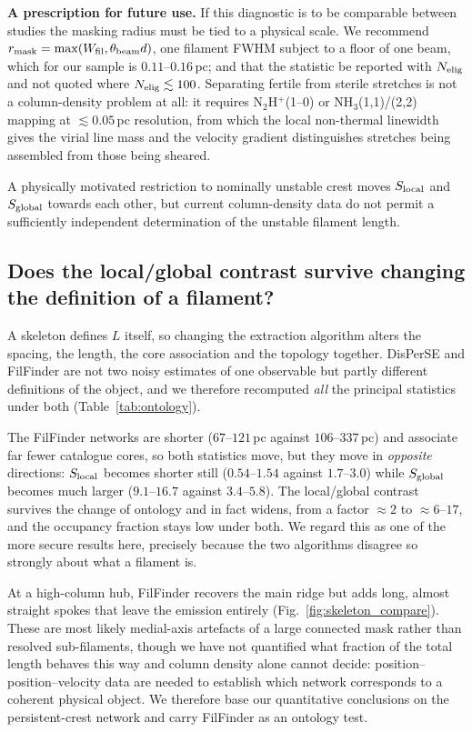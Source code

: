\documentclass[usenatbib,twoside,twocolumn]{mnras}
\begin{document}
\smallskip\noindent\textbf{A prescription for future use.} If this diagnostic is to be comparable between studies the masking radius must be tied to a physical scale. We recommend $r_{\rm mask}=\max(W_{\rm fil},\theta_{\rm beam}d)$, one filament FWHM subject to a floor of one beam, which for our sample is $0.11$--$0.16$\,pc; and that the statistic be reported with $N_{\rm elig}$ and not quoted where $N_{\rm elig}\lesssim100$. Separating fertile from sterile stretches is not a column-density problem at all: it requires N$_2$H$^+$(1--0) or NH$_3$(1,1)/(2,2) mapping at $\lesssim0.05$\,pc resolution, from which the local non-thermal linewidth gives the virial line mass and the velocity gradient distinguishes stretches being assembled from those being sheared.

A physically motivated restriction to nominally unstable crest moves $S_{\rm local}$ and $S_{\rm global}$ towards each other, but current column-density data do not permit a sufficiently independent determination of the unstable filament length.



\subsection{Does the local/global contrast survive changing the definition of a filament?}
\label{sec:ontology}

A skeleton defines $L$ itself, so changing the extraction algorithm alters the spacing, the length, the core association and the topology together. DisPerSE and FilFinder are not two noisy estimates of one observable but partly different definitions of the object, and we therefore recomputed \emph{all} the principal statistics under both (Table~\ref{tab:ontology}).

The FilFinder networks are shorter ($67$--$121$\,pc against $106$--$337$\,pc) and associate far fewer catalogue cores, so both statistics move, but they move in \emph{opposite} directions: $S_{\rm local}$ becomes shorter still ($0.54$--$1.54$ against $1.7$--$3.0$) while $S_{\rm global}$ becomes much larger ($9.1$--$16.7$ against $3.4$--$5.8$). The local/global contrast survives the change of ontology and in fact widens, from a factor $\approx2$ to $\approx6$--$17$, and the occupancy fraction stays low under both. We regard this as one of the more secure results here, precisely because the two algorithms disagree so strongly about what a filament is.

At a high-column hub, FilFinder recovers the main ridge but adds long, almost straight spokes that leave the emission entirely (Fig.~\ref{fig:skeleton_compare}). These are most likely medial-axis artefacts of a large connected mask rather than resolved sub-filaments, though we have not quantified what fraction of the total length behaves this way and column density alone cannot decide: position--position--velocity data are needed to establish which network corresponds to a coherent physical object. We therefore base our quantitative conclusions on the persistent-crest network and carry FilFinder as an ontology test.
\end{document}
